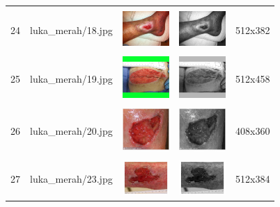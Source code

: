 \begin{table}[H]
\begin{tabular}{|m{0.2in}|m{1.2in}|m{0.7in}|m{0.7in}|m{0.7in}|}
		& &  &  &\\
		24& 
		luka\_merah/18.jpg &
		\includegraphics[width=0.7in]{dataset/dataset_3/luka_merah/ready/18.jpg}&
		\includegraphics[width=0.7in]{dataset/dataset_3/luka_merah/ready/18_gray.jpg}&
		512x382\\
		\hline
		
		& &  &  &\\
		25& 
		luka\_merah/19.jpg &
		\includegraphics[width=0.7in]{dataset/dataset_3/luka_merah/ready/19.jpg}&
		\includegraphics[width=0.7in]{dataset/dataset_3/luka_merah/ready/19_gray.jpg}&
		512x458\\
		\hline
		
		& &  &  &\\
		26& 
		luka\_merah/20.jpg &
		\includegraphics[width=0.7in]{dataset/dataset_3/luka_merah/ready/20.jpg}&
		\includegraphics[width=0.7in]{dataset/dataset_3/luka_merah/ready/20_gray.jpg}&
		408x360\\
		\hline
		
		& &  &  &\\
		27& 
		luka\_merah/23.jpg &
		\includegraphics[width=0.7in]{dataset/dataset_3/luka_merah/ready/23.jpg}&
		\includegraphics[width=0.7in]{dataset/dataset_3/luka_merah/ready/23_gray.jpg}&
		512x384\\
		\hline
		

\end{tabular}
\end{table}

